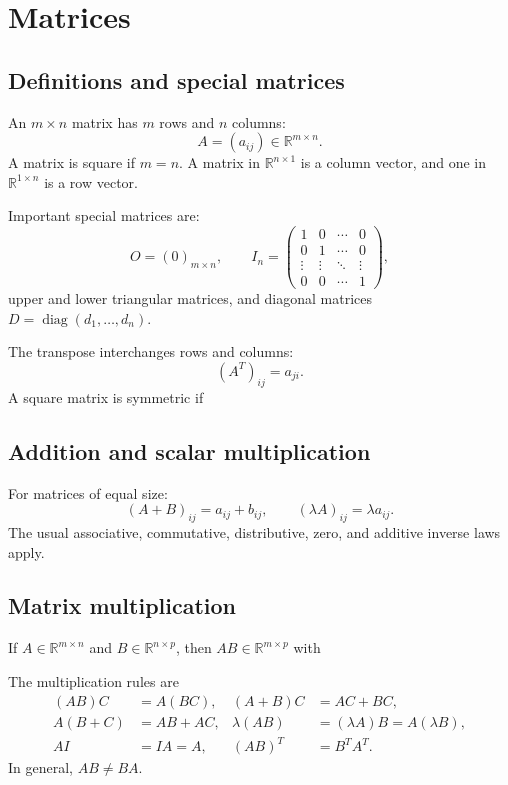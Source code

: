 \documentclass{article}
\begin{document}
\section{Matrices}

\subsection{Definitions and special matrices}
An $m\times n$ matrix has $m$ rows and $n$ columns:
\[
    A=(a_{ij})\in\mathbb{R}^{m\times n}.
\]
A matrix is square if $m=n$. A matrix in $\mathbb{R}^{n\times1}$ is a
column vector, and one in $\mathbb{R}^{1\times n}$ is a row vector.

Important special matrices are:
\[
    O=(0)_{m\times n},\qquad
    I_n=\begin{pmatrix}
        1&0&\cdots&0\\
        0&1&\cdots&0\\
        \vdots&\vdots&\ddots&\vdots\\
        0&0&\cdots&1
    \end{pmatrix},
\]
upper and lower triangular matrices, and diagonal matrices
$D=\operatorname{diag}(d_1,\dots,d_n)$.

The transpose interchanges rows and columns:
\[
    (A^T)_{ij}=a_{ji}.
\]
A square matrix is symmetric if

\subsection{Addition and scalar multiplication}
For matrices of equal size:
\[
    (A+B)_{ij}=a_{ij}+b_{ij},\qquad
    (\lambda A)_{ij}=\lambda a_{ij}.
\]
The usual associative, commutative, distributive, zero, and additive
inverse laws apply.

\subsection{Matrix multiplication}
If $A\in\mathbb{R}^{m\times n}$ and
$B\in\mathbb{R}^{n\times p}$, then
$AB\in\mathbb{R}^{m\times p}$ with

The multiplication rules are
\begin{align*}
    (AB)C&=A(BC),&
    (A+B)C&=AC+BC,\\
    A(B+C)&=AB+AC,&
    \lambda(AB)&=(\lambda A)B=A(\lambda B),\\
    AI&=IA=A,&
    (AB)^T&=B^T A^T.
\end{align*}
In general, $AB\neq BA$.
\end{document}
